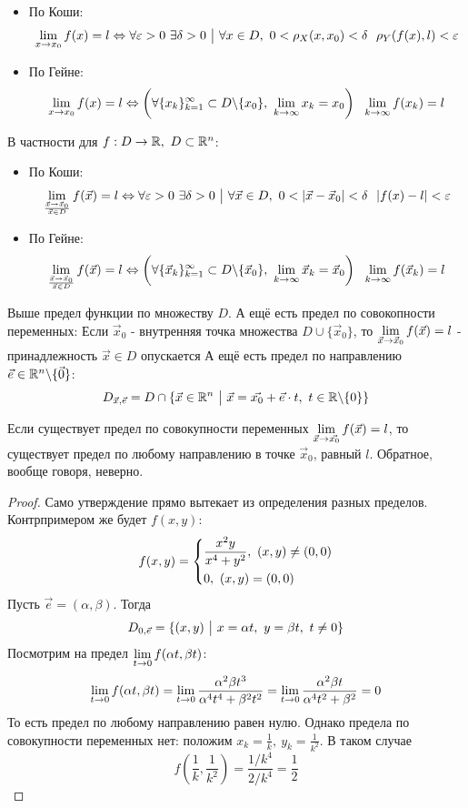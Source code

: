 \begin{definition}
	\begin{itemize}
		\item По Коши:
		\[
			\liml_{x \to x_0} f(x) = l \lra \forall \eps > 0\ \exists \delta > 0 \such \forall x \in D,\ 0 < \rho_X (x, x_0) < \delta\ \ \rho_Y(f(x), l) < \eps
		\]
		
		\item По Гейне:
		\[
			\liml_{x \to x_0} f(x) = l \lra \left(\forall \{x_k\}_{k = 1}^\infty \subset D \bs \{x_0\},\ \liml_{k \to \infty} x_k = x_0\right)\ \ \liml_{k \to \infty} f(x_k) = l
		\]
	\end{itemize}
	В частности для $f: D \to \mathbb{R},\ D \subset \mathbb{R}^n$:
	\begin{itemize}
		\item По Коши:
		\[
			\liml_{\vec{x} \to \vec{x}_0 \over \vec{x} \in D} f(\vec{x}) = l \lra \forall \eps > 0\ \exists \delta > 0 \such \forall \vec{x} \in D,\ 0 < |\vec{x} - \vec{x}_0| < \delta\ \ |f(x) - l| < \eps
		\]
		
		\item По Гейне:
		\[
			\lim\limits_{\vec{x} \to \vec{x}_0 \over \vec{x} \in D} f(\vec{x}) = l \Leftrightarrow \left(\forall \{\vec{x}_k\}_{k = 1}^\infty \subset D \backslash \{\vec{x}_0\},\ \lim\limits_{k \to \infty} \vec{x}_k = \vec{x}_0\right)\ \ \lim\limits_{k \to \infty} f(\vec{x}_k) = l
		\]
	\end{itemize}
	Выше предел функции по множеству $D$. А ещё есть предел по совокопности переменных:
	Если $\vec{x}_0$ - внутренняя точка множества $D \cup \{\vec{x}_0\}$, то $\lim\limits_{\vec{x} \to \vec{x}_0} f(\vec{x}) = l$ - принадлежность $\vec{x} \in D$ опускается
	А ещё есть предел по направлению $\vec{e} \in \mathbb{R}^n \backslash \{\vec{0}\}$:
	\[
		D_{\vec{x}, \vec{e}} = D \cap \{\vec{x} \in \mathbb{R}^n \ \big|\  \vec{x} = \vec{x_0} + \vec{e} \cdot t,\ t \in \mathbb{R} \backslash \{0\}\}
	\]
\end{definition}

\begin{theorem}
	Если существует предел по совокупности переменных $\lim\limits_{\vec{x} \to \vec{x_0}} f(\vec{x}) = l$, то существует предел по любому направлению в точке $\vec{x}_0$, равный $l$. Обратное, вообще говоря, неверно.
\end{theorem}

\begin{proof}
	Само утверждение прямо вытекает из определения разных пределов. Контрпримером же будет $f(x, y)$:
	\[
		f(x, y) = \left\{\begin{aligned}
			&{\frac{x^2 y}{x^4 + y^2},\ (x, y) \neq (0, 0)}
			\\
			&{0,\ (x, y) = (0, 0)}
		\end{aligned}\right.
	\]
	Пусть $\vec{e} = (\alpha, \beta)$. Тогда
	\[
		D_{0, \vec{e}} = \{(x, y) \ \big|\  x = \alpha t,\ y = \beta t,\ t \neq 0\}
	\]
	Посмотрим на предел $\lim\limits_{t \to 0} f(\alpha t, \beta t)$:
	\[
		\lim\limits_{t \to 0} f(\alpha t, \beta t) = \lim\limits_{t \to 0} \frac{\alpha^2 \beta t^3}{\alpha^4 t^4 + \beta^2 t^2} = \lim\limits_{t \to 0} \frac{\alpha^2 \beta t}{\alpha^4 t^2 + \beta^2} = 0
	\]
	То есть предел по любому направлению равен нулю. Однако предела по совокупности переменных нет: положим $x_k = \frac{1}{k},\ y_k = \frac{1}{k^2}$. В таком случае
	\[
		f\left(\frac{1}{k}, \frac{1}{k^2}\right) = \frac{1 / k^4}{2 / k^4} = \frac{1}{2}
	\]
\end{proof}

